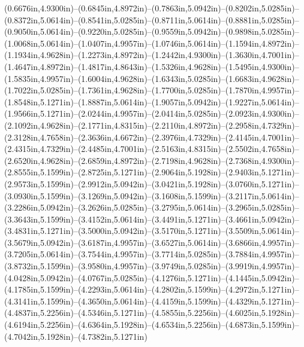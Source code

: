 (0.6676in,4.9300in)--(0.6845in,4.8972in)--(0.7863in,5.0942in)--(0.8202in,5.0285in)--(0.8372in,5.0614in)--(0.8541in,5.0285in)--(0.8711in,5.0614in)--(0.8881in,5.0285in)--(0.9050in,5.0614in)--(0.9220in,5.0285in)--(0.9559in,5.0942in)--(0.9898in,5.0285in)--(1.0068in,5.0614in)--(1.0407in,4.9957in)--(1.0746in,5.0614in)--(1.1594in,4.8972in)--(1.1934in,4.9628in)--(1.2273in,4.8972in)--(1.2442in,4.9300in)--(1.3630in,4.7001in)--(1.4647in,4.8972in)--(1.4817in,4.8643in)--(1.5326in,4.9628in)--(1.5495in,4.9300in)--(1.5835in,4.9957in)--(1.6004in,4.9628in)--(1.6343in,5.0285in)--(1.6683in,4.9628in)--(1.7022in,5.0285in)--(1.7361in,4.9628in)--(1.7700in,5.0285in)--(1.7870in,4.9957in)--(1.8548in,5.1271in)--(1.8887in,5.0614in)--(1.9057in,5.0942in)--(1.9227in,5.0614in)--(1.9566in,5.1271in)--(2.0244in,4.9957in)--(2.0414in,5.0285in)--(2.0923in,4.9300in)--(2.1092in,4.9628in)--(2.1771in,4.8315in)--(2.2110in,4.8972in)--(2.2958in,4.7329in)--(2.3128in,4.7658in)--(2.3636in,4.6672in)--(2.3976in,4.7329in)--(2.4145in,4.7001in)--(2.4315in,4.7329in)--(2.4485in,4.7001in)--(2.5163in,4.8315in)--(2.5502in,4.7658in)--(2.6520in,4.9628in)--(2.6859in,4.8972in)--(2.7198in,4.9628in)--(2.7368in,4.9300in)--(2.8555in,5.1599in)--(2.8725in,5.1271in)--(2.9064in,5.1928in)--(2.9403in,5.1271in)--(2.9573in,5.1599in)--(2.9912in,5.0942in)--(3.0421in,5.1928in)--(3.0760in,5.1271in)--(3.0930in,5.1599in)--(3.1269in,5.0942in)--(3.1608in,5.1599in)--(3.2117in,5.0614in)--(3.2286in,5.0942in)--(3.2626in,5.0285in)--(3.2795in,5.0614in)--(3.2965in,5.0285in)--(3.3643in,5.1599in)--(3.4152in,5.0614in)--(3.4491in,5.1271in)--(3.4661in,5.0942in)--(3.4831in,5.1271in)--(3.5000in,5.0942in)--(3.5170in,5.1271in)--(3.5509in,5.0614in)--(3.5679in,5.0942in)--(3.6187in,4.9957in)--(3.6527in,5.0614in)--(3.6866in,4.9957in)--(3.7205in,5.0614in)--(3.7544in,4.9957in)--(3.7714in,5.0285in)--(3.7884in,4.9957in)--(3.8732in,5.1599in)--(3.9580in,4.9957in)--(3.9749in,5.0285in)--(3.9919in,4.9957in)--(4.0428in,5.0942in)--(4.0767in,5.0285in)--(4.1276in,5.1271in)--(4.1445in,5.0942in)--(4.1785in,5.1599in)--(4.2293in,5.0614in)--(4.2802in,5.1599in)--(4.2972in,5.1271in)--(4.3141in,5.1599in)--(4.3650in,5.0614in)--(4.4159in,5.1599in)--(4.4329in,5.1271in)--(4.4837in,5.2256in)--(4.5346in,5.1271in)--(4.5855in,5.2256in)--(4.6025in,5.1928in)--(4.6194in,5.2256in)--(4.6364in,5.1928in)--(4.6534in,5.2256in)--(4.6873in,5.1599in)--(4.7042in,5.1928in)--(4.7382in,5.1271in) 